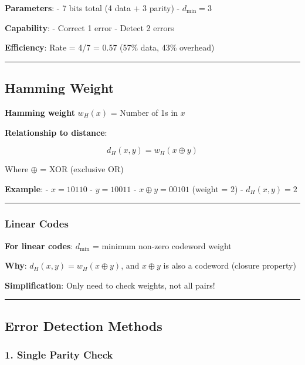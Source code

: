\textbf{Parameters}: - 7 bits total (4 data + 3 parity) -
\(d_{\min} = 3\)

\textbf{Capability}: - Correct 1 error - Detect 2 errors

\textbf{Efficiency}: Rate = 4/7 = 0.57 (57\% data, 43\% overhead)

\begin{center}\rule{0.5\linewidth}{0.5pt}\end{center}

\subsection{Hamming Weight}\label{hamming-weight}

\textbf{Hamming weight} \(w_H(x)\) = Number of 1\textquotesingle s in
\(x\)

\textbf{Relationship to distance}:

\[
d_H(x, y) = w_H(x \oplus y)
\]

Where \(\oplus\) = XOR (exclusive OR)

\textbf{Example}: - \(x = 10110\) - \(y = 10011\) -
\(x \oplus y = 00101\) (weight = 2) - \(d_H(x, y) = 2\)

\begin{center}\rule{0.5\linewidth}{0.5pt}\end{center}

\subsubsection{Linear Codes}\label{linear-codes}

\textbf{For linear codes}: \(d_{\min}\) = minimum non-zero codeword
weight

\textbf{Why}: \(d_H(x, y) = w_H(x \oplus y)\), and \(x \oplus y\) is
also a codeword (closure property)

\textbf{Simplification}: Only need to check weights, not all pairs!

\begin{center}\rule{0.5\linewidth}{0.5pt}\end{center}

\subsection{Error Detection Methods}\label{error-detection-methods}

\subsubsection{1. Single Parity Check}\label{single-parity-check}

